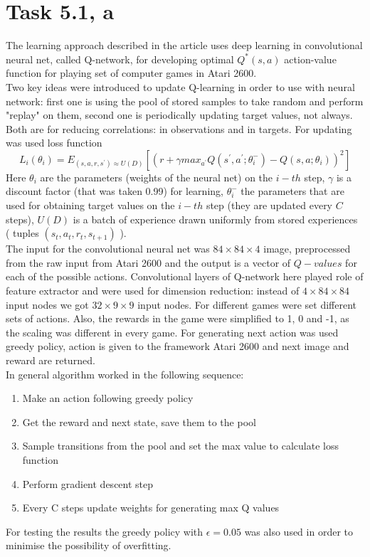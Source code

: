\documentclass[english]{scrartcl}
\begin{document}
\section*{Task 5.1, a}
The learning approach described in the article uses deep learning in convolutional neural net, called Q-network, for developing optimal $Q^{*}(s,a)$ action-value function for playing set of computer games in Atari 2600. 
\\Two key ideas were introduced to update Q-learning in order to use with neural network: first one is using the pool of stored samples to take random and perform "replay" on them, second one is periodically updating target values, not always. Both are for reducing correlations: in observations and in targets. For updating was used loss function $$L_{i}(\theta_{i})=E_{(s,a,r,s^{\prime})\approx U(D)}[(r+\gamma max_{a^{\prime}} Q(s^{\prime},a^{\prime};\theta_{i}^{-})-Q(s,a;\theta_{i}))^{2}]$$
Here $\theta_{i}$ are the parameters (weights of the neural net) on the $i-th$ step, $\gamma$ is a discount factor (that was taken 0.99) for learning, $\theta_{i}^{-}$ the parameters that are used for obtaining target values on the $i-th$ step (they are updated every $C$ steps), $U(D)$ is a batch of experience drawn uniformly from stored experiences ( tuples $(s_{t},a_{t},r_{t},s_{t+1})$ ). 
\\The input for the convolutional neural net was $84\times84\times4$ image, preprocessed from the raw input from Atari 2600 and the output is a vector of $Q-values$ for each of the possible actions. Convolutional layers of Q-network here played role of feature extractor and were used for dimension reduction: instead of $4\times 84\times 84$ input nodes we got $32\times 9\times 9$ input nodes. For different games were set different sets of actions. Also, the rewards in the game were simplified to 1, 0 and -1, as the scaling was different in every game. For generating next action was used greedy policy, action is given to the framework Atari 2600 and next image and reward are returned. 
\\In general algorithm worked in the following sequence:
\begin{enumerate}
\item Make an action following greedy policy
\item Get the reward and next state, save them to the pool
\item Sample transitions from the pool and set the max value to calculate loss function
\item Perform gradient descent step
\item Every C steps update weights for generating max Q values
\end{enumerate}
For testing the results the greedy policy with $\epsilon = 0.05$ was also used in order to minimise the possibility of overfitting.
\end{document}
